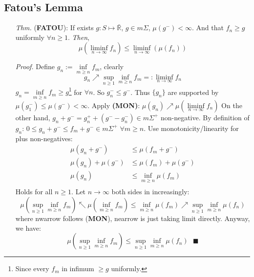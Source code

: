 \documentclass[a4paper,12pt,twoside]{book}
\begin{document}
\subsection{Fatou's Lemma}
\begin{itemize}
	\item[\textit{Thm.}] (\textbf{FATOU}): If exists $g: S\mapsto \bar{\mathbb{R}}$, $g\in m\Sigma$, $\mu(g^-)< \infty$. And that $f_n\geq g$ uniformly $\forall n\geq 1$. \textit{Then},
	\begin{equation}
	 	\mu(\liminf\limits_{n\rightarrow\infty}f_n)\leq \liminf\limits_{n\rightarrow\infty}(\mu(f_n))
	\end{equation} 

	\item[\textit{Proof.}] Define $g_n:=\inf\limits_{m\geq n}f_m$, clearly
	\begin{equation}
		g_n \nearrow  \sup\limits_{n\geq 1}\inf\limits_{m\geq n}f_m =: \liminf\limits_{n\rightarrow\infty}f_n
	\end{equation}
	$g_n=\inf\limits_{m\geq n}f_m\geq g$\footnote{Since every $f_m$ in infimum $\geq g$ uniformly.} for $\forall n$. So $g_n^-\leq g^-$.\newline
	Thus $\{g_n\}$ are supported by $\mu(g_1^-)\leq \mu(g^-) < \infty$. Apply \textbf{(MON)}: $\mu(g_n)\nearrow \mu(\liminf\limits_{n\rightarrow\infty}f_n)$\newline
	On the other hand, $g_n + g^- = g_n^+ +(g^- - g_n^-) \in m\Sigma^+$ non-negative. By definition of $g_n$: $0\leq g_n+g^- \leq f_m +g^-\in m\Sigma^+$ $\forall m\geq n$. Use monotonicity/linearity for plus non-negatives:
	\begin{equation}
		\begin{split}
			\mu(g_n+g^-) &\leq \mu(f_m +g^-)\\
			\mu(g_n)+\mu(g^-) &\leq \mu(f_m) + \mu(g^-)\\
			\mu(g_n) &\leq \inf\limits_{m\geq n}\mu(f_m)\\
		\end{split}
	\end{equation}
	Holds for all $n\geq 1$. Let $n\to \infty$ both sides in increasingly:
	\begin{equation}
		\mu(\sup\limits_{n\geq 1}\inf\limits_{m\geq n}f_m)\nwarrow\mu(\inf\limits_{m\geq n}f_m) \leq \inf\limits_{m\geq n}\mu(f_m) \nearrow \sup\limits_{n\geq 1}\inf\limits_{m\geq n}\mu(f_n)
	\end{equation}
	where nwarrow follows (\textbf{MON}), nearrow is just taking limit directly. Anyway, we have:
	\begin{equation}
		\mu(\sup\limits_{n\geq 1}\inf\limits_{m\geq n}f_m) \leq \sup\limits_{n\geq 1}\inf\limits_{m\geq n}\mu(f_n)~~~\blacksquare
	\end{equation}


\end{itemize}
\end{document}
